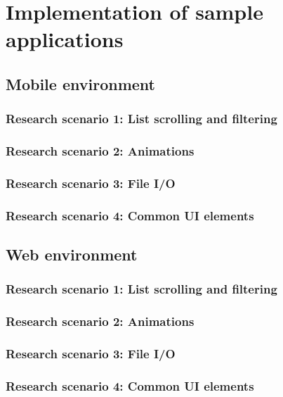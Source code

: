 
\chapter{Implementation of sample applications}

\section{Mobile environment}

\subsection{Research scenario 1: List scrolling and filtering}

\subsection{Research scenario 2: Animations}

\subsection{Research scenario 3: File I/O}

\subsection{Research scenario 4: Common UI elements}

\section{Web environment}

\subsection{Research scenario 1: List scrolling and filtering}

\subsection{Research scenario 2: Animations}

\subsection{Research scenario 3: File I/O}

\subsection{Research scenario 4: Common UI elements}

